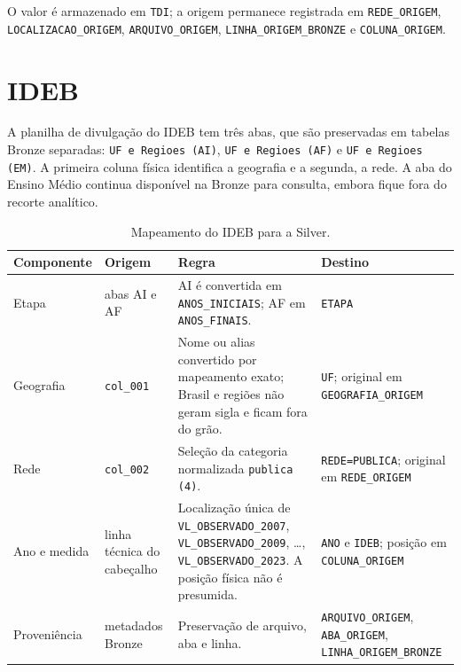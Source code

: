 O valor é armazenado em \texttt{TDI}; a origem permanece registrada em \texttt{REDE\_ORIGEM}, \texttt{LOCALIZACAO\_ORIGEM}, \texttt{ARQUIVO\_ORIGEM}, \texttt{LINHA\_ORIGEM\_BRONZE} e \texttt{COLUNA\_ORIGEM}.

\section{IDEB}

A planilha de divulgação do IDEB tem três abas, que são preservadas em tabelas Bronze separadas: \texttt{UF e Regioes (AI)}, \texttt{UF e Regioes (AF)} e \texttt{UF e Regioes (EM)}. A primeira coluna física identifica a geografia e a segunda, a rede. A aba do Ensino Médio continua disponível na Bronze para consulta, embora fique fora do recorte analítico.

\begin{table}[H]
\centering
\scriptsize
\caption{Mapeamento do IDEB para a Silver.}
\label{tab:ap-ideb-layout}
\renewcommand{\arraystretch}{1.15}
\begin{tabular}{|p{3.1cm}|p{4.0cm}|p{4.0cm}|p{4.0cm}|}
\hline
\textbf{Componente} & \textbf{Origem} & \textbf{Regra} & \textbf{Destino} \\ \hline
Etapa & abas AI e AF & AI é convertida em \texttt{ANOS\_INICIAIS}; AF em \texttt{ANOS\_FINAIS}. & \texttt{ETAPA} \\ \hline
Geografia & \texttt{col\_001} & Nome ou alias convertido por mapeamento exato; Brasil e regiões não geram sigla e ficam fora do grão. & \texttt{UF}; original em \texttt{GEOGRAFIA\_ORIGEM} \\ \hline
Rede & \texttt{col\_002} & Seleção da categoria normalizada \texttt{publica (4)}. & \texttt{REDE=PUBLICA}; original em \texttt{REDE\_ORIGEM} \\ \hline
Ano e medida & linha técnica do cabeçalho & Localização única de \texttt{VL\_OBSERVADO\_2007}, \texttt{VL\_OBSERVADO\_2009}, \ldots, \texttt{VL\_OBSERVADO\_2023}. A posição física não é presumida. & \texttt{ANO} e \texttt{IDEB}; posição em \texttt{COLUNA\_ORIGEM} \\ \hline
Proveniência & metadados Bronze & Preservação de arquivo, aba e linha. & \texttt{ARQUIVO\_ORIGEM}, \texttt{ABA\_ORIGEM}, \texttt{LINHA\_ORIGEM\_BRONZE} \\ \hline
\end{tabular}
\end{table}

